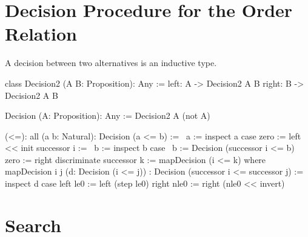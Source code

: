 \vskip 5mm
\section{Decision Procedure for the Order Relation}



A decision between two alternatives is an inductive type.

\begin{alba}
    class Decision2 (A B: Proposition): Any :=
        left: A  -> Decision2 A B
        right: B -> Decision2 A B

    Decision (A: Proposition): Any :=
        Decision2 A (not A)
\end{alba}



\begin{alba}
    (<=): all (a b: Natural): Decision (a <= b) :=
        \ a :=
            inspect a case
                zero :=
                    left << init
                successor i :=
                    \ b :=
                        inspect b case
                            {\ b := Decision (successor i <= b)}
                            zero :=
                                right discriminate
                            successor k :=
                                mapDecision (i <= k)
        where
            mapDecision
                {i j} (d: Decision (i <= j))
                : Decision (successor i <= successor j)
            :=
                inspect d case
                    left le0 :=
                        left (step le0)
                    right nle0 :=
                        right (nle0 << invert)
\end{alba}





\vskip 5mm
\section{Search}

